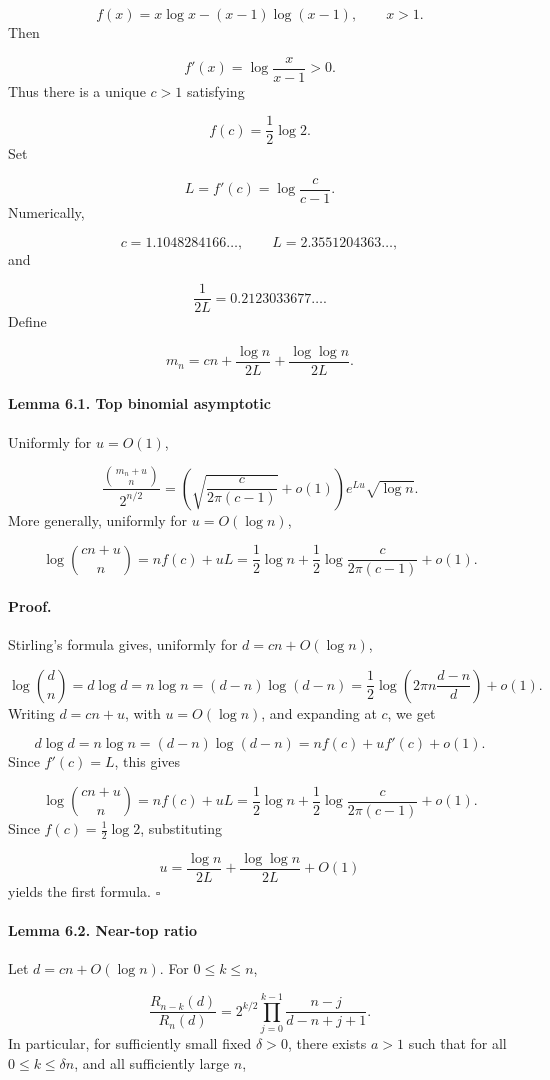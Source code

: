 \documentclass[11pt]{article}
\theoremstyle{definition}
\begin{document}
\[
f(x)=x\log x-(x-1)\log(x-1),
\qquad x>1.
\]
Then

\[
f'(x)=\log\frac{x}{x-1}>0.
\]
Thus there is a unique $c>1$ satisfying

\[
f(c)=\frac12\log2.
\]
Set

\[
L=f'(c)=\log\frac c{c-1}.
\]
Numerically,

\[
c=1.1048284166\ldots,
\qquad
L=2.3551204363\ldots,
\]
and

\[
\frac1{2L}=0.2123033677\ldots.
\]
Define

\[
m_n=
cn+
\frac{\log n}{2L}
+
\frac{\log\log n}{2L}.
\]
\paragraph{Lemma 6.1. Top binomial asymptotic}
Uniformly for $u=O(1)$,

\[
\frac{\binom{m_n+u}{n}}{2^{n/2}}
=
\left(
\sqrt{\frac{c}{2\pi(c-1)}}+o(1)
\right)
e^{Lu}\sqrt{\log n}.
\]
More generally, uniformly for $u=O(\log n)$,

\[
\log\binom{cn+u}{n}
=
n f(c)
+
uL
=
\frac12\log n
+
\frac12\log\frac{c}{2\pi(c-1)}
+
o(1).
\]
\paragraph{Proof.}
Stirling's formula gives, uniformly for $d=cn+O(\log n)$,

\[
\log\binom dn
=
d\log d
=
n\log n
=
(d-n)\log(d-n)
=
\frac12\log\left(2\pi n\frac{d-n}{d}\right)
+
o(1).
\]
Writing $d=cn+u$, with $u=O(\log n)$, and expanding at $c$, we get

\[
d\log d
=
n\log n
=
(d-n)\log(d-n)
=
n f(c)+u f'(c)+o(1).
\]
Since $f'(c)=L$, this gives

\[
\log\binom{cn+u}{n}
=
n f(c)
+
uL
=
\frac12\log n
+
\frac12\log\frac{c}{2\pi(c-1)}
+
o(1).
\]
Since $f(c)=\frac12\log2$, substituting

\[
u=
\frac{\log n}{2L}
+
\frac{\log\log n}{2L}
+
O(1)
\]
yields the first formula. $\square$

\paragraph{Lemma 6.2. Near-top ratio}
Let $d=cn+O(\log n)$. For $0\le k\le n$,

\[
\frac{R_{n-k}(d)}{R_n(d)}
=
2^{k/2}
\prod_{j=0}^{k-1}
\frac{n-j}{d-n+j+1}.
\]
In particular, for sufficiently small fixed $\delta>0$, there exists $a>1$ such that for all $0\le k\le\delta n$, and all sufficiently large $n$,
\end{document}
